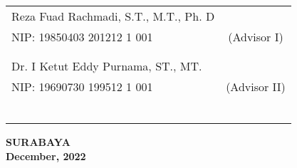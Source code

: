 \noindent
\begin{tabularx}{\textwidth}{X c}
  Reza Fuad Rachmadi, S.T., M.T., Ph. D &              \\
  NIP: 19850403 201212 1 001            & (Advisor I)  \\
                                        &              \\
                                        &              \\
  Dr. I Ketut Eddy Purnama, ST., MT.    &              \\
  NIP: 19690730 199512 1 001            & (Advisor II) \\
                                        &              \\
                                        &              \\
                                        &              \\
                                        &              \\
                                        &              \\
                                        &              \\
\end{tabularx}
\endgroup

\vspace{4ex}

\begin{center}
  \textbf{SURABAYA} \\
  \textbf{December, 2022}
\end{center}
\endgroup
